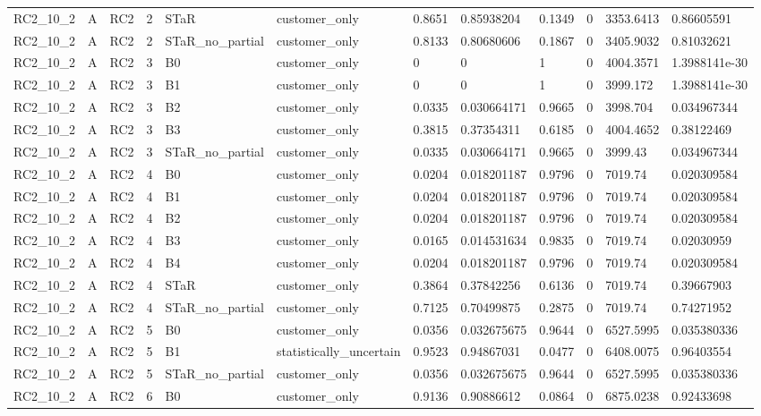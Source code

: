 \begin{longtable}{llllllllllll}
RC2\_10\_2 & A & RC2 & 2 & STaR & customer\_only & 0.8651 & 0.85938204 & 0.1349 & 0 & 3353.6413 & 0.86605591 \\
RC2\_10\_2 & A & RC2 & 2 & STaR\_no\_partial & customer\_only & 0.8133 & 0.80680606 & 0.1867 & 0 & 3405.9032 & 0.81032621 \\
RC2\_10\_2 & A & RC2 & 3 & B0 & customer\_only & 0 & 0 & 1 & 0 & 4004.3571 & 1.3988141e-30 \\
RC2\_10\_2 & A & RC2 & 3 & B1 & customer\_only & 0 & 0 & 1 & 0 & 3999.172 & 1.3988141e-30 \\
RC2\_10\_2 & A & RC2 & 3 & B2 & customer\_only & 0.0335 & 0.030664171 & 0.9665 & 0 & 3998.704 & 0.034967344 \\
RC2\_10\_2 & A & RC2 & 3 & B3 & customer\_only & 0.3815 & 0.37354311 & 0.6185 & 0 & 4004.4652 & 0.38122469 \\
RC2\_10\_2 & A & RC2 & 3 & STaR\_no\_partial & customer\_only & 0.0335 & 0.030664171 & 0.9665 & 0 & 3999.43 & 0.034967344 \\
RC2\_10\_2 & A & RC2 & 4 & B0 & customer\_only & 0.0204 & 0.018201187 & 0.9796 & 0 & 7019.74 & 0.020309584 \\
RC2\_10\_2 & A & RC2 & 4 & B1 & customer\_only & 0.0204 & 0.018201187 & 0.9796 & 0 & 7019.74 & 0.020309584 \\
RC2\_10\_2 & A & RC2 & 4 & B2 & customer\_only & 0.0204 & 0.018201187 & 0.9796 & 0 & 7019.74 & 0.020309584 \\
RC2\_10\_2 & A & RC2 & 4 & B3 & customer\_only & 0.0165 & 0.014531634 & 0.9835 & 0 & 7019.74 & 0.02030959 \\
RC2\_10\_2 & A & RC2 & 4 & B4 & customer\_only & 0.0204 & 0.018201187 & 0.9796 & 0 & 7019.74 & 0.020309584 \\
RC2\_10\_2 & A & RC2 & 4 & STaR & customer\_only & 0.3864 & 0.37842256 & 0.6136 & 0 & 7019.74 & 0.39667903 \\
RC2\_10\_2 & A & RC2 & 4 & STaR\_no\_partial & customer\_only & 0.7125 & 0.70499875 & 0.2875 & 0 & 7019.74 & 0.74271952 \\
RC2\_10\_2 & A & RC2 & 5 & B0 & customer\_only & 0.0356 & 0.032675675 & 0.9644 & 0 & 6527.5995 & 0.035380336 \\
RC2\_10\_2 & A & RC2 & 5 & B1 & statistically\_uncertain & 0.9523 & 0.94867031 & 0.0477 & 0 & 6408.0075 & 0.96403554 \\
RC2\_10\_2 & A & RC2 & 5 & STaR\_no\_partial & customer\_only & 0.0356 & 0.032675675 & 0.9644 & 0 & 6527.5995 & 0.035380336 \\
RC2\_10\_2 & A & RC2 & 6 & B0 & customer\_only & 0.9136 & 0.90886612 & 0.0864 & 0 & 6875.0238 & 0.92433698 \\

\end{longtable}
